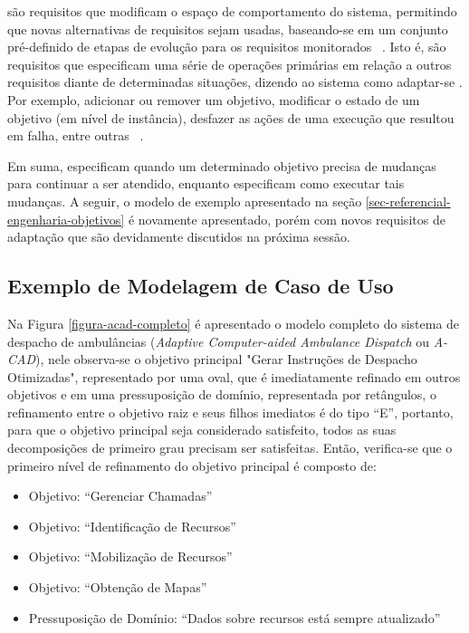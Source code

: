 \evoreqs são requisitos que modificam o espaço de comportamento do sistema, permitindo que novas alternativas de requisitos sejam usadas, baseando-se em um conjunto pré-definido de etapas de evolução para os requisitos monitorados ~\cite{souza2012requirement}. Isto é, \evoreqs são requisitos que especificam uma série de operações primárias em relação a outros  requisitos diante de determinadas situações, dizendo ao sistema como adaptar-se \cite{souza2012requirement}. Por exemplo, adicionar ou remover um objetivo, modificar o estado de um objetivo (em nível de instância), desfazer as ações de uma execução que resultou em falha, entre outras ~\cite{souza2013requirements}.

Em suma, \awreqs especificam quando um determinado objetivo precisa de mudanças para continuar a ser atendido, enquanto \evoreqs especificam como executar tais mudanças. A seguir, o modelo de exemplo apresentado na seção \ref{sec-referencial-engenharia-objetivos} é novamente apresentado, porém com novos requisitos de adaptação que são devidamente discutidos na próxima sessão.

\subsection{Exemplo de Modelagem de Caso de Uso}
\label{sec-referencial-engenharia-objetivos-exemplo}

Na Figura \ref{figura-acad-completo} é apresentado o modelo completo do sistema de despacho de ambulâncias (\textit{Adaptive Computer-aided	Ambulance Dispatch} ou \textit{A-CAD}), nele observa-se o objetivo principal "Gerar Instruções de Despacho Otimizadas", representado por uma oval, que é imediatamente refinado em outros objetivos e em uma pressuposição de domínio, representada por retângulos, o refinamento entre o objetivo raiz e seus filhos imediatos é do tipo ``E'', portanto, para que o objetivo principal seja considerado satisfeito, todos as suas decomposições de primeiro grau precisam ser satisfeitas. Então, verifica-se que o primeiro nível de refinamento do objetivo principal é composto de:

\begin{itemize}
	\item Objetivo: ``Gerenciar Chamadas''
	\item Objetivo: ``Identificação de Recursos''
	\item Objetivo: ``Mobilização de Recursos''
	\item Objetivo: ``Obtenção de Mapas''
	\item Pressuposição de Domínio: ``Dados sobre recursos está sempre atualizado''
\end{itemize}

